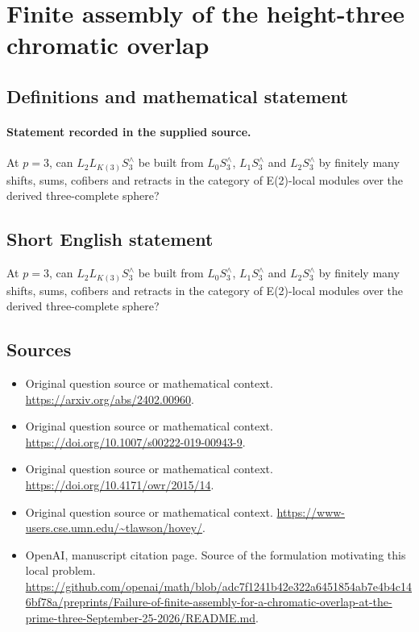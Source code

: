 \documentclass[11pt]{article}
\begin{document}
\section*{Finite assembly of the height-three chromatic overlap}\label{statement}
\subsection{Definitions and mathematical statement}
\paragraph{Statement recorded in the supplied source.}
At $p=3$, can $L_{2}L_{K(3)}S_{3}^\wedge $ be built from $L_{0}S_{3}^\wedge $, $L_{1}S_{3}^\wedge $ and $L_{2}S_{3}^\wedge $ by finitely many shifts, sums, cofibers and retracts in the category of E(2)-local modules over the derived three-complete sphere?
\subsection{Short English statement}
At $p=3$, can $L_{2}L_{K(3)}S_{3}^\wedge $ be built from $L_{0}S_{3}^\wedge $, $L_{1}S_{3}^\wedge $ and $L_{2}S_{3}^\wedge $ by finitely many shifts, sums, cofibers and retracts in the category of E(2)-local modules over the derived three-complete sphere?
\subsection{Sources}
\begin{itemize}
\item[S1] Original question source or mathematical context.
\url{https://arxiv.org/abs/2402.00960}.
\item[S2] Original question source or mathematical context.
\url{https://doi.org/10.1007/s00222-019-00943-9}.
\item[S3] Original question source or mathematical context.
\url{https://doi.org/10.4171/owr/2015/14}.
\item[S4] Original question source or mathematical context.
\url{https://www-users.cse.umn.edu/~tlawson/hovey/}.
\item[S5] OpenAI, manuscript citation page. Source of the formulation motivating this local problem.
\url{https://github.com/openai/math/blob/adc7f1241b42e322a6451854ab7e4b4c146bf78a/preprints/Failure-of-finite-assembly-for-a-chromatic-overlap-at-the-prime-three-September-25-2026/README.md}.
\end{itemize}
\end{document}
